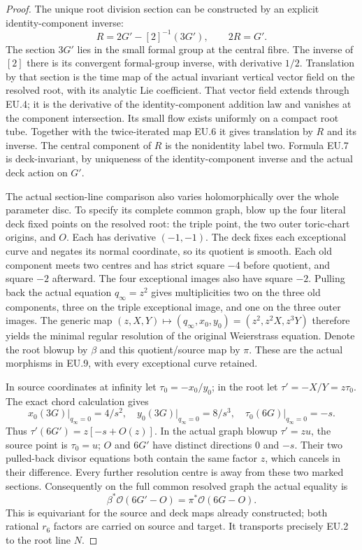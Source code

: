 \begin{proof}
The unique root division section can be constructed by an explicit
identity-component inverse:
\[
             R=2G'-[2]^{-1}(3G'),\qquad 2R=G'.
 \tag{EU.7}
\]
The section \(3G'\) lies in the small formal group at the central
fibre. The inverse of \([2]\) there is its convergent formal-group
inverse, with derivative \(1/2\). Translation by that section is
the time map of the actual invariant vertical vector field on the
resolved root, with its analytic Lie coefficient. That vector field
extends through EU.4; it is the derivative of the identity-component
addition law and vanishes at the component intersection. Its small
flow exists uniformly on a compact root tube. Together with the
twice-iterated map EU.6 it gives translation by \(R\) and its inverse.
The central component of \(R\) is the nonidentity label two. Formula
EU.7 is deck-invariant, by uniqueness of the identity-component
inverse and the actual deck action on \(G'\).

The actual section-line comparison also varies holomorphically over
the whole parameter disc. To specify its complete common graph,
blow up the four literal deck fixed points on the resolved root:
the triple point, the two outer toric-chart origins, and \(O\).
Each has derivative \((-1,-1)\). The deck fixes each exceptional
curve and negates its normal coordinate, so its quotient is smooth.
Each old component meets two centres and has strict square \(-4\)
before quotient, and square \(-2\) afterward. The four exceptional
images also have square \(-2\). Pulling back the actual equation
\(q_\infty=z^2\) gives multiplicities two on the three old
components, three on the triple exceptional image, and one on the
three outer images. The generic map
\((z,X,Y)\mapsto(q_\infty,x_0,y_0)=(z^2,z^2X,z^3Y)\)
therefore yields the minimal regular resolution of the original
Weierstrass equation. Denote the root blowup by \(\beta\) and this
quotient/source map by \(\pi\). These are the actual morphisms
in EU.9, with every exceptional curve retained.

In source coordinates at infinity let
\(\tau_0=-x_0/y_0\); in the root let \(\tau'=-X/Y=z\tau_0\).
The exact chord calculation gives
\[
 x_0(3G)\big|_{q_\infty=0}=4/s^2,\quad
 y_0(3G)\big|_{q_\infty=0}=8/s^3,\quad
 \tau_0(6G)\big|_{q_\infty=0}=-s.
 \tag{EU.8}
\]
Thus \(\tau'(6G')=z[-s+O(z)]\). In the actual graph blowup
\(\tau'=z u\), the source point is \(\tau_0=u\); \(O\) and
\(6G'\) have distinct directions \(0\) and \(-s\). Their two
pulled-back divisor equations both contain the same factor \(z\),
which cancels in their difference. Every further resolution centre
is away from these two marked sections. Consequently on the full
common resolved graph the actual equality is
\[
       \beta^*\mathcal O(6G'-O)=\pi^*\mathcal O(6G-O).
 \tag{EU.9}
\]
This is equivariant for the source and deck maps already constructed;
both rational \(r_6\) factors are carried on source and target. It
transports precisely EU.2 to the root line \(N\).


\end{proof}
